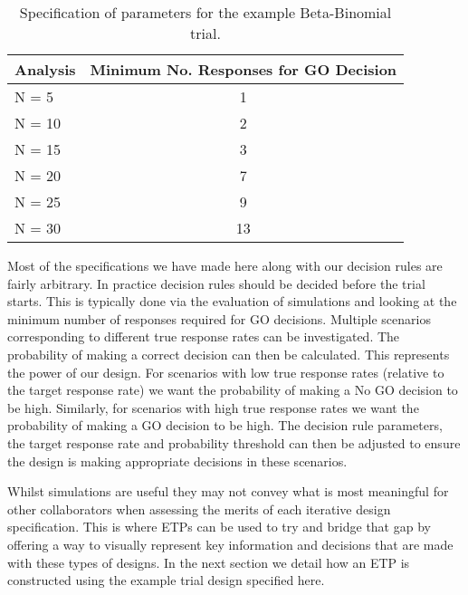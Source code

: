 \begin{table}[h!]
	\centering
	\caption{Specification of parameters for the example Beta-Binomial trial.}
	\label{tab_etp:exampleBBspecs}
	\begin{tabular}{l|c}
		\hline
		\textbf{Analysis}     & \textbf{Minimum No. Responses for GO Decision}               \\ \hline
		N = 5  & 1                            \\
		N = 10 & 2                            \\
		N = 15 & 3                           \\
		N = 20 & 7                            \\
		N = 25 & 9                         \\
		N = 30 & 13                  \\ \hline
	\end{tabular}
\end{table}

Most of the specifications we have made here along with our decision rules are fairly arbitrary. In practice decision rules should be decided before the trial starts. This is typically done via the evaluation of simulations and looking at the minimum number of responses required for GO decisions. Multiple scenarios corresponding to different true response rates can be investigated. The probability of making a correct decision can then be calculated. This represents the power of our design. For scenarios with low true response rates (relative to the target response rate) we want the probability of making a No GO decision to be high. Similarly, for scenarios with high true response rates we want the probability of making a GO decision to be high. The decision rule parameters, the target response rate and probability threshold can then be adjusted to ensure the design is making appropriate decisions in these scenarios. 	

Whilst simulations are useful they may not convey what is most meaningful for other collaborators when assessing the merits of each iterative design specification. This is where ETPs can be used to try and bridge that gap by offering a way to visually represent key information and decisions that are made with these types of designs. In the next section we detail how an ETP is constructed using the example trial design specified here. 


